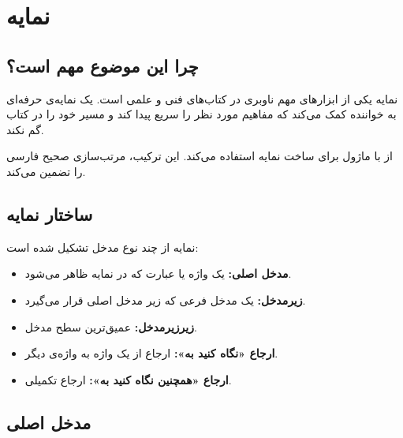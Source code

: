 
\chapter{نمایه}
\label{chap:index}

\section{چرا این موضوع مهم است؟}
\label{sec:index-why}

نمایه یکی از ابزارهای مهم ناوبری در کتاب‌های
فنی و علمی است. یک نمایه‌ی حرفه‌ای به خواننده
کمک می‌کند که مفاهیم مورد نظر را سریع پیدا
کند و مسیر خود را در کتاب گم نکند.

 از  با ماژول
 برای ساخت نمایه استفاده
می‌کند. این ترکیب، مرتب‌سازی صحیح فارسی را
تضمین می‌کند.


\section{ساختار نمایه}
\label{sec:index-structure}

نمایه از چند نوع مدخل تشکیل شده است:

\begin{itemize}
    \item \textbf{مدخل اصلی:} یک واژه یا عبارت
    که در نمایه ظاهر می‌شود.
    \item \textbf{زیرمدخل:} یک مدخل فرعی که
    زیر مدخل اصلی قرار می‌گیرد.
    \item \textbf{زیرزیرمدخل:} عمیق‌ترین سطح
    مدخل.
    \item \textbf{ارجاع «نگاه کنید به»:} ارجاع
    از یک واژه به واژه‌ی دیگر.
    \item \textbf{ارجاع «همچنین نگاه کنید به»:}
    ارجاع تکمیلی.
\end{itemize}


\section{مدخل اصلی}
\label{sec:index-main}

